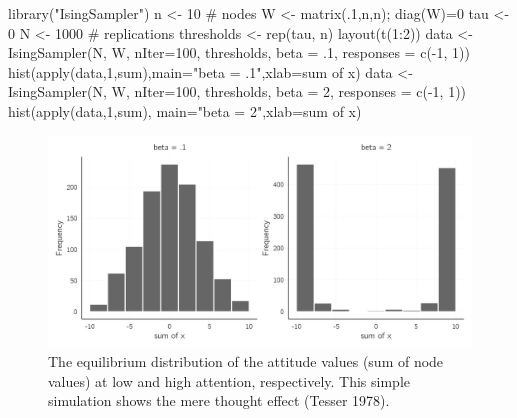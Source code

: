 \documentclass[
  a4paper,
  DIV=11,
  numbers=noendperiod]{scrreprt}
\newenvironment{Shaded}{\begin{snugshade}}{\end{snugshade}}
\newcommand{\AttributeTok}[1]{\textcolor[rgb]{0.40,0.45,0.13}{#1}}
\newcommand{\CommentTok}[1]{\textcolor[rgb]{0.37,0.37,0.37}{#1}}
\newcommand{\DecValTok}[1]{\textcolor[rgb]{0.68,0.00,0.00}{#1}}
\newcommand{\FunctionTok}[1]{\textcolor[rgb]{0.28,0.35,0.67}{#1}}
\newcommand{\NormalTok}[1]{\textcolor[rgb]{0.00,0.23,0.31}{#1}}
\newcommand{\OtherTok}[1]{\textcolor[rgb]{0.00,0.23,0.31}{#1}}
\newcommand{\SpecialCharTok}[1]{\textcolor[rgb]{0.37,0.37,0.37}{#1}}
\newcommand{\StringTok}[1]{\textcolor[rgb]{0.13,0.47,0.30}{#1}}
\begin{document}
\begin{Shaded}
\begin{Highlighting}[]
\FunctionTok{library}\NormalTok{(}\StringTok{"IsingSampler"}\NormalTok{)}
\NormalTok{n }\OtherTok{\textless{}{-}} \DecValTok{10} \CommentTok{\# nodes}
\NormalTok{W }\OtherTok{\textless{}{-}} \FunctionTok{matrix}\NormalTok{(.}\DecValTok{1}\NormalTok{,n,n); }\FunctionTok{diag}\NormalTok{(W)}\OtherTok{=}\DecValTok{0}
\NormalTok{tau }\OtherTok{\textless{}{-}} \DecValTok{0}
\NormalTok{N }\OtherTok{\textless{}{-}} \DecValTok{1000} \CommentTok{\# replications}
\NormalTok{thresholds }\OtherTok{\textless{}{-}} \FunctionTok{rep}\NormalTok{(tau, n)}
\FunctionTok{layout}\NormalTok{(}\FunctionTok{t}\NormalTok{(}\DecValTok{1}\SpecialCharTok{:}\DecValTok{2}\NormalTok{))}
\NormalTok{data }\OtherTok{\textless{}{-}} \FunctionTok{IsingSampler}\NormalTok{(N, W, }\AttributeTok{nIter=}\DecValTok{100}\NormalTok{, thresholds, }\AttributeTok{beta =}\NormalTok{ .}\DecValTok{1}\NormalTok{, }\AttributeTok{responses =} \FunctionTok{c}\NormalTok{(}\SpecialCharTok{{-}}\DecValTok{1}\NormalTok{, }\DecValTok{1}\NormalTok{))}
\FunctionTok{hist}\NormalTok{(}\FunctionTok{apply}\NormalTok{(data,}\DecValTok{1}\NormalTok{,sum),}\AttributeTok{main=}\StringTok{"beta = .1"}\NormalTok{,}\AttributeTok{xlab=}\StringTok{\textquotesingle{}sum of x\textquotesingle{}}\NormalTok{)}
\NormalTok{data }\OtherTok{\textless{}{-}} \FunctionTok{IsingSampler}\NormalTok{(N, W, }\AttributeTok{nIter=}\DecValTok{100}\NormalTok{, thresholds, }\AttributeTok{beta =} \DecValTok{2}\NormalTok{, }\AttributeTok{responses =} \FunctionTok{c}\NormalTok{(}\SpecialCharTok{{-}}\DecValTok{1}\NormalTok{, }\DecValTok{1}\NormalTok{))}
\FunctionTok{hist}\NormalTok{(}\FunctionTok{apply}\NormalTok{(data,}\DecValTok{1}\NormalTok{,sum), }\AttributeTok{main=}\StringTok{"beta = 2"}\NormalTok{,}\AttributeTok{xlab=}\StringTok{\textquotesingle{}sum of x\textquotesingle{}}\NormalTok{)}
\end{Highlighting}
\end{Shaded}

\begin{figure}

{\centering \includegraphics{media/ch6/fig-ch6-img12-old-81.jpg}

}

\caption{\label{fig-ch6-img12-old-81}The equilibrium distribution of the
attitude values (sum of node values) at low and high attention,
respectively. This simple simulation shows the mere thought effect
(Tesser 1978).}

\end{figure}
\end{document}
